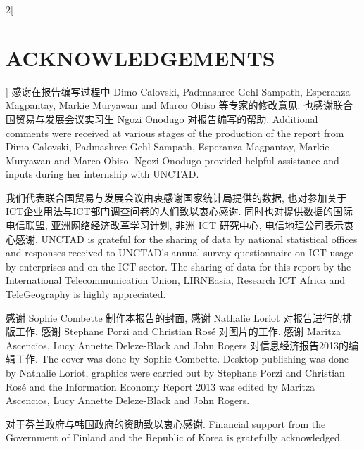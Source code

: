 \documentclass[a4paper, UTF8, 12pt]{article}
\begin{document}
\begin{paracol}{2}[\section{ACKNOWLEDGEMENTS}]
    \switchcolumn*
    感谢在报告编写过程中 Dimo Calovski, Padmashree Gehl Sampath, Esperanza Magpantay, Markie Muryawan and Marco Obiso 等专家的修改意见. 也感谢联合国贸易与发展会议实习生 Ngozi Onodugo 对报告编写的帮助.
    \switchcolumn
    Additional comments were received at various stages of the production of the report from Dimo Calovski, Padmashree Gehl Sampath, Esperanza Magpantay, Markie Muryawan and Marco Obiso. Ngozi Onodugo provided helpful assistance and inputs during her internship with UNCTAD. 
   
    \switchcolumn*
    我们代表联合国贸易与发展会议由衷感谢国家统计局提供的数据, 也对参加关于ICT企业用法与ICT部门调查问卷的人们致以衷心感谢. 同时也对提供数据的国际电信联盟, 亚洲网络经济改革学习计划, 非洲 ICT 研究中心,  电信地理公司表示衷心感谢.
    \switchcolumn
    UNCTAD is grateful for the sharing of data by national statistical offices and responses received to UNCTAD’s annual survey questionnaire on ICT usage by enterprises and on the ICT sector. The sharing of data for this report by the International Telecommunication Union, LIRNEasia, Research ICT Africa and TeleGeography is highly appreciated. 
   
    \switchcolumn*
    感谢 Sophie Combette 制作本报告的封面, 感谢 Nathalie Loriot 对报告进行的排版工作, 感谢 Stephane Porzi and Christian Rosé 对图片的工作. 感谢  Maritza Ascencios, Lucy Annette Deleze-Black and John Rogers 对信息经济报告2013的编辑工作.
    \switchcolumn
    The cover was done by Sophie Combette. Desktop publishing was done by Nathalie Loriot, graphics were carried out by Stephane Porzi and Christian Rosé and the Information Economy Report 2013 was edited by Maritza Ascencios, Lucy Annette Deleze-Black and John Rogers. 
   
    \switchcolumn*
    对于芬兰政府与韩国政府的资助致以衷心感谢.
    \switchcolumn
    Financial support from the Government of Finland and the Republic of Korea is gratefully acknowledged. 
\end{paracol}
\end{document}
